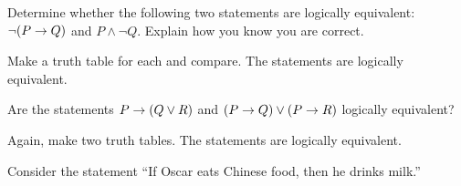 \begin{questions}

\question Determine whether the following two statements are logically equivalent: $\neg(P \rightarrow Q)$ and $P \wedge \neg Q$.  Explain how you know you are correct.

  \begin{answer}
    Make a truth table for each and compare.  The statements are logically equivalent.
  \end{answer}

  
  

\question Are the statements $P \rightarrow (Q\vee R)$ and $(P \rightarrow Q) \vee (P \rightarrow R)$ logically equivalent?

  \begin{answer}
    Again, make two truth tables.  The statements are logically equivalent.
  \end{answer}



 
\question Consider the statement ``If Oscar eats Chinese food, then he drinks milk.''

  \begin{answer}
    \begin{parts}

\end{parts}
\end{answer}
\end{questions}

